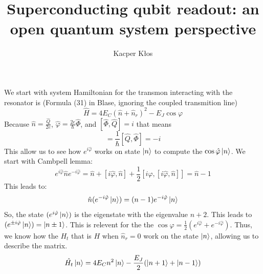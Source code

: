 \documentclass[12pt]{article}
\title{Superconducting qubit readout: an open quantum system perspective}
\author{Kacper Kłos}
\begin{document}
\maketitle


We start with system Hamiltonian for the transmon interacting with the resonator is (Formula (31) in Blase, ignoring the coupled transmition line) 
\begin{equation}
    \hat{H} = 4 E_C (\hat{n} + \hat{n}_r)^2 - E_J \cos \varphi
\end{equation}
Because $\hat{n} = \frac{\hat{Q}}{2e}$, $\hat{\varphi} = \frac{2e}{\hbar} \hat{\Phi}$, and $[\hat{\Phi}, \hat{Q}] = i$  that means 
\begin{equation}
    [\hat{n}, \hat{\varphi}] = \frac{1}{\hbar} [\hat{Q}, \hat{\Phi}] = -i
\end{equation}
This allow us to see how $e^{i \hat{\varphi}}$ works on state $\ket n$ to compute the $\cos \hat{\varphi} \ket n$. We start with Cambpell lemma:
\begin{equation}
    e^{i \hat{\varphi}} \hat{n} e^{-i \hat{\varphi}} = \hat{n} + [i \hat{\varphi}, \hat{n}] + \frac{1}{2} [i \hat{\varphi}, [i \hat{\varphi}, \hat{n}]] = \hat{n} - 1
\end{equation}
This leads to:
\begin{equation}
    \hat{n}(e^{-i \hat{\varphi}} \ket n) = (n-1) e^{-i \hat{\varphi}} \ket n
\end{equation}
So, the state $(e^{i \hat{\varphi}} \ket n)$ is the eigenstate with the eigenvalue $n+2$. This leads to $(e^{\pm i \hat{\varphi}} \ket n) = \ket{n \pm 1}$. This is relevent for the the $\cos \varphi = \frac{1}{2} (e^{i \hat{\varphi}} + e^{-i \hat{\varphi}})$. Thus, we know how the $H_t$ that is $H$ when $\hat{n}_r = 0$ work on the state $\ket n$, allowing us to describe the matrix.
\begin{equation}
\hat{H_t} \ket n = 4 E_C n^2 \ket n - \frac{E_J}{2}(\ket{n+1} + \ket{n-1})
\end{equation}
\end{document}
